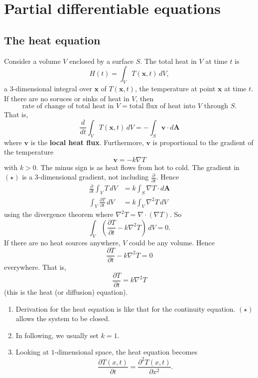 \chapter{Partial differentiable equations}
\section{The heat equation}

Consider a volume $V$ enclosed by a surface $S$.
The total heat in $V$ at time $t$ is
\[
    H(t) = \int_V T(\bm x, t) \,dV,
\]
a 3-dimensional integral over $\bm x$ of $T(\bm x, t)$,
the temperature at point $\bm x$ at time $t$.
If there are no soruces or sinks of heat in $V$, then
\[
    \text{rate of change of total heat in $V$}
    =
    \text{total flux of heat into $V$ through $S$}.
\]
That is,
\[
    \frac{d}{dt} \int_V T(\bm x, t) \,dV
    = - \int_S \bm v \cdot d\bm A
\]
where $\bm v$ is the \textbf{local heat flux}.
Furthermore, $\bm v$ is proportional to the gradient
of the temperature
\[
    \bm v = -k\nabla T \tag{$\star$}
\]
with $k > 0$. The minus sign is as heat flows from hot to cold.
The gradient in $(\star)$ is a 3-dimensional gradient,
not including $\frac{\partial}{\partial t}$.
Hence
\begin{align*}
    \frac{\partial}{\partial t} \int_V T \,dV
    &= k\int_S \nabla T \cdot d\bm A \\
    \int_V \frac{\partial T}{\partial t} \,dV
    &= k\int_V \nabla^2 T \,dV
\end{align*}
using the divergence theorem where 
$\nabla^2 T = \nabla \cdot (\nabla T)$.
So
\[
    \int_V
    \left(
        \frac{\partial T}{\partial t} - k\nabla^2 T
    \right)
    \,dV = 0.
\]
If there are no heat sources anywhere, $V$ could be
any volume. Hence
\[
    \frac{\partial T}{\partial t} - k\nabla^2T = 0
\]
everywhere. That is,
\[
    \frac{\partial T}{\partial t} = k\nabla^2 T
\]
(this is the heat (or diffusion) equation).

\begin{remark}
    \hfill
    \begin{enumerate}
        \item Derivation for the heat equation is like that 
            for the continuity equation. 
            $(\star)$ allows the system to be closed.

        \item In following, we usually set $k = 1$.

        \item Looking at $1$-dimensional space,
            the heat equation becomes
            \[
                \frac{\partial T(x, t)}{\partial t} 
                = \frac{\partial^2 T(x,t)}{\partial x^2}.
            \]
    \end{enumerate}
\end{remark}

